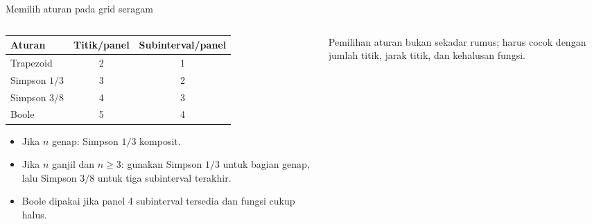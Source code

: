 \documentclass[aspectratio=169,10pt]{beamer}
\begin{document}
\begin{frame}{Memilih aturan pada grid seragam}
\scriptsize
\begin{columns}[T,totalwidth=\textwidth]
\begin{column}{.52\textwidth}
\begin{greenbox}
\begin{tabular}{lcc}
\toprule
Aturan & Titik/panel & Subinterval/panel\\\midrule
Trapezoid & 2 & 1\\
Simpson $1/3$ & 3 & 2\\
Simpson $3/8$ & 4 & 3\\
Boole & 5 & 4\\
\bottomrule
\end{tabular}
\end{greenbox}
\begin{orangebox}[Strategi]
\begin{itemize}\setlength\itemsep{1pt}
\item Jika $n$ genap: Simpson $1/3$ komposit.
\item Jika $n$ ganjil dan $n\ge3$: gunakan Simpson $1/3$ untuk bagian genap, lalu Simpson $3/8$ untuk tiga subinterval terakhir.
\item Boole dipakai jika panel 4 subinterval tersedia dan fungsi cukup halus.
\end{itemize}
\end{orangebox}
\end{column}
\begin{column}{.44\textwidth}
\begin{bluebox}[Catatan]
Pemilihan aturan bukan sekadar rumus; harus cocok dengan jumlah titik, jarak titik, dan kehalusan fungsi.
\end{bluebox}
\end{column}
\end{columns}
\end{frame}
\end{document}
